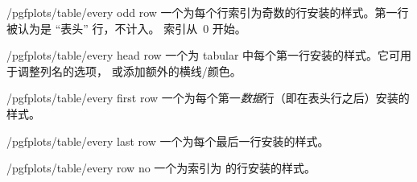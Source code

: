 \documentclass[a4paper,doc2]{ltxdoc}
\begin{document}
\begin{stylekey}{/pgfplots/table/every odd row}
    一个为每个行索引为奇数的行安装的样式。第一行被认为是 ``表头'' 行，不计入。
    索引从~$0$ 开始。
\end{stylekey}

\begin{stylekey}{/pgfplots/table/every head row}
    一个为 tabular 中每个第一行安装的样式。它可用于调整列名的选项，
    或添加额外的横线/颜色。

\begin{codeexample}[]
\end{codeexample}
\end{stylekey}

\begin{stylekey}{/pgfplots/table/every first row}
    一个为每个第一\emph{数据}行（即在表头行之后）安装的样式。
\end{stylekey}

\begin{stylekey}{/pgfplots/table/every last row}
    一个为每个最后一行安装的样式。
\end{stylekey}

\begin{stylekey}{/pgfplots/table/every row no }
    一个为索引为  的行安装的样式。
\end{stylekey}
\end{document}
